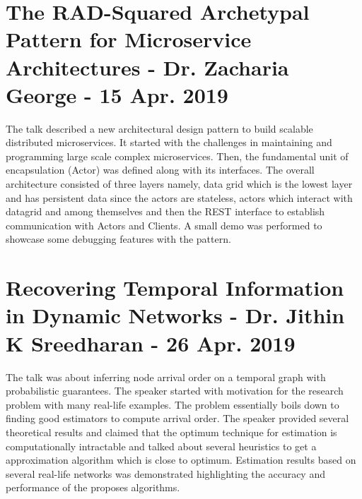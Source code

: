 \documentclass[11pt,a4paper,oneside]{article}
\begin{document}
	\section{The RAD-Squared Archetypal Pattern for Microservice Architectures - Dr. Zacharia George - 15 Apr. 2019}
	
	The talk described a new architectural design pattern to build scalable distributed microservices. It started with the challenges in maintaining and programming large scale complex microservices. Then, the fundamental unit of encapsulation (Actor) was defined along with its interfaces. The overall architecture consisted of three layers namely, data grid which is the lowest layer and has persistent data since the actors are stateless, actors which interact with datagrid and among themselves and then the REST interface to establish communication with Actors and Clients. A small demo was performed to showcase some debugging features with the pattern.
	
	\section{Recovering Temporal Information in Dynamic Networks - Dr. Jithin K Sreedharan - 26 Apr. 2019}
	
	The talk was about inferring node arrival order on a temporal graph with probabilistic guarantees. The speaker started with motivation for the research problem with many real-life examples. The problem essentially boils down to finding good estimators to compute arrival order. The speaker provided several theoretical results and claimed that the optimum technique for estimation is computationally intractable and talked about several heuristics to get a approximation algorithm which is close to optimum. Estimation results based on several real-life networks was demonstrated highlighting the accuracy and performance of the proposes algorithms. 
	
    
\end{document}
